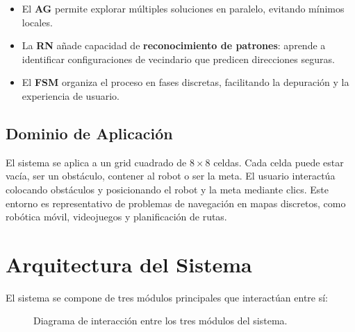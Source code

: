 \documentclass[12pt,a4paper]{article}
\begin{document}
\begin{itemize}
  \item El \textbf{AG} permite explorar m\'ultiples soluciones en paralelo, evitando m\'inimos locales.
  \item La \textbf{RN} a\~nade capacidad de \textbf{reconocimiento de patrones}: aprende a identificar configuraciones de vecindario que predicen direcciones seguras.
  \item El \textbf{FSM} organiza el proceso en fases discretas, facilitando la depuraci\'on y la experiencia de usuario.
\end{itemize}

\subsection{Dominio de Aplicaci\'on}

El sistema se aplica a un grid cuadrado de $8 \times 8$ celdas. Cada celda puede estar vac\'ia, ser un obst\'aculo, contener al robot o ser la meta. El usuario interact\'ua colocando obst\'aculos y posicionando el robot y la meta mediante clics. Este entorno es representativo de problemas de navegaci\'on en mapas discretos, como rob\'otica m\'ovil, videojuegos y planificaci\'on de rutas.

\section{Arquitectura del Sistema}

El sistema se compone de tres m\'odulos principales que interact\'uan entre s\'i:

\begin{figure}[H]
\centering
{}
\caption{Diagrama de interacci\'on entre los tres m\'odulos del sistema.}
\label{fig:arquitectura}
\end{figure}
\end{document}
